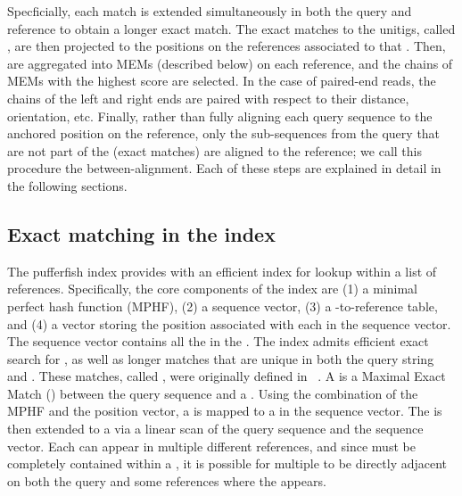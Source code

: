 Specficially, each \kmer match is extended simultaneously in both the  query and reference to 
obtain a longer exact match. The exact matches to the unitigs, called \unimems, are then projected to
the positions on the references associated to that \unitig. Then, \unimems  are aggregated into MEMs 
(described below) on each reference, and the chains of MEMs with the highest score are selected. 
In the case of paired-end reads, the chains of the left and right ends are paired with respect to their distance,
orientation, etc. Finally, rather than fully aligning each query sequence to the anchored position 
on the reference, only the sub-sequences from the query that are not part of the \unimems (exact
matches) are aligned to the reference; we call this procedure the between-\mem alignment. Each of 
these steps are explained in detail in the following sections.

\subsection{Exact matching in the \pufferfish index}

The pufferfish index provides \puffaligner with an efficient index for \kmer lookup within a list of references. 
Specifically, the core components of the index are (1) a minimal perfect hash function (MPHF), (2) a \unitig 
sequence vector, (3) a \unitig-to-reference table, and (4) a vector storing the position associated with each
\kmer in the \unitig sequence vector. The \unitig sequence vector contains all the \unitigs in the 
\ccdbgshort. The \pufferfish index admits efficient exact search for \kmers, as well as longer matches
that are unique in both the query string and \ccdbg. These matches, called \unimem, were originally 
defined in \debga~\citep{debga}. A \unimem is a Maximal Exact Match (\mem) between the query sequence
and a \unitig. Using the combination of the MPHF and the position vector, a \kmer is mapped to a \unitig 
in the \unitig sequence vector. The \kmer is then extended to a \unimem via a linear scan 
of the query sequence and the \unitig sequence vector. Each \unimem can appear  in multiple different references, 
and since \unimems must be completely contained within a \unitig, it is possible for multiple 
\unimems to be directly adjacent on both the query and some references where the \unitig appears.

